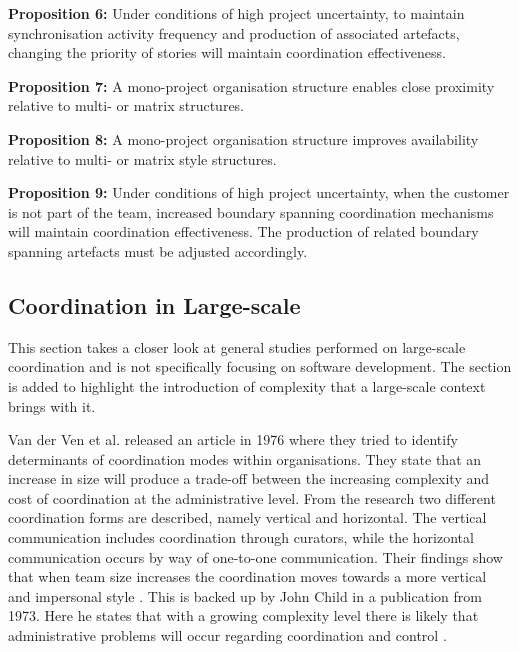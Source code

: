 \begin{fancyquotes}
\textbf{Proposition 6:} Under conditions of high project uncertainty, to maintain synchronisation activity frequency and production of associated artefacts, changing the priority of stories will maintain coordination effectiveness.
\end{fancyquotes}

\begin{fancyquotes}
\textbf{Proposition 7:} A mono-project organisation structure enables close proximity relative to multi- or matrix structures.
\end{fancyquotes}

\begin{fancyquotes}
\textbf{Proposition 8:} A mono-project organisation structure improves availability relative to multi- or matrix style structures.
\end{fancyquotes}

\begin{fancyquotes}
\textbf{Proposition 9:} Under conditions of high project uncertainty, when the customer is not part of the team, increased boundary spanning coordination mechanisms will maintain coordination effectiveness. The production of related boundary spanning artefacts must be adjusted accordingly.
\end{fancyquotes}

\subsection{Coordination in Large-scale}
\label{largescalecor}

This section takes a closer look at general studies performed on large-scale coordination and is not specifically focusing on software development. The section is added to highlight the introduction of complexity that a large-scale context brings with it.

Van der Ven et al. released an article in 1976 where they tried to identify determinants of coordination modes within organisations. They state that an increase in size will produce a trade-off between the increasing complexity and cost of coordination at the administrative level. From the research two different coordination forms are described, namely vertical and horizontal. The vertical communication includes coordination through curators, while the horizontal communication occurs by way of one-to-one communication. Their findings show that when team size increases the coordination moves towards a more vertical and impersonal style \cite{Ven1976}. This is backed up by John Child in a publication from 1973. Here he states that with a growing complexity level there is likely that administrative problems will occur regarding coordination and control \cite{Child1973}.

